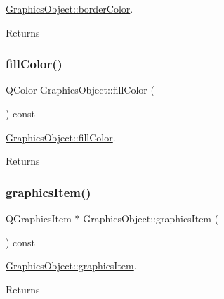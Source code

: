 \hyperlink{class_graphics_object_a2d1ae6917ba3a02c305ce48f04e4aa65}{Graphics\+Object\+::border\+Color}. 

\begin{DoxyReturn}{Returns}

\end{DoxyReturn}
\mbox{\label{class_graphics_object_a2575009e9051dc8cd582c23ceb4cebec}} 
\subsubsection{\texorpdfstring{fill\+Color()}{fillColor()}}
{\footnotesize\ttfamily Q\+Color Graphics\+Object\+::fill\+Color (\begin{DoxyParamCaption}{ }\end{DoxyParamCaption}) const}



\hyperlink{class_graphics_object_a2575009e9051dc8cd582c23ceb4cebec}{Graphics\+Object\+::fill\+Color}. 

\begin{DoxyReturn}{Returns}

\end{DoxyReturn}
\mbox{\label{class_graphics_object_abd625951730f006e748570bf00d158bf}} 
\subsubsection{\texorpdfstring{graphics\+Item()}{graphicsItem()}}
{\footnotesize\ttfamily Q\+Graphics\+Item $\ast$ Graphics\+Object\+::graphics\+Item (\begin{DoxyParamCaption}{ }\end{DoxyParamCaption}) const\hspace{0.3cm}{\ttfamily [virtual]}}



\hyperlink{class_graphics_object_abd625951730f006e748570bf00d158bf}{Graphics\+Object\+::graphics\+Item}. 

\begin{DoxyReturn}{Returns}

\end{DoxyReturn}


